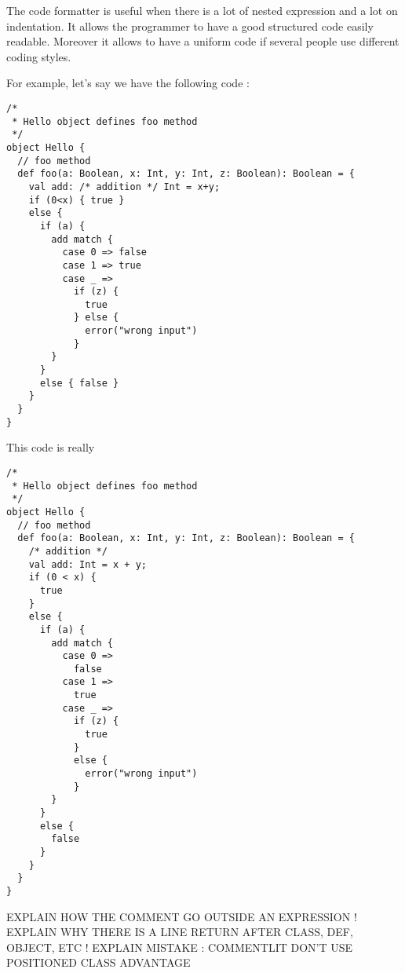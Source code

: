 The code formatter is useful when there is a lot of nested expression and a lot on indentation. It allows the programmer to have a good structured code easily readable. Moreover it allows to have a uniform code if several people use different coding styles.

For example, let's say we have the following code : \\

\begin{lstlisting}
/*
 * Hello object defines foo method
 */
object Hello {
  // foo method	
  def foo(a: Boolean, x: Int, y: Int, z: Boolean): Boolean = {
    val add: /* addition */ Int = x+y;
    if (0<x) { true } 
    else {
      if (a) {
        add match {
          case 0 => false
          case 1 => true
          case _ =>
            if (z) {
              true
            } else {
              error("wrong input")
            }
        }
      }
      else { false }
    }
  }
}
\end{lstlisting}

This code is really 

\begin{lstlisting}
/*
 * Hello object defines foo method
 */
object Hello {
  // foo method	
  def foo(a: Boolean, x: Int, y: Int, z: Boolean): Boolean = {
    /* addition */  	
    val add: Int = x + y;
    if (0 < x) {
      true
    }
    else {
      if (a) {
        add match {
          case 0 =>
            false
          case 1 =>
            true
          case _ =>
            if (z) {
              true
            }
            else {
              error("wrong input")
            }
        }
      }
      else {
        false
      }
    }
  }
}
\end{lstlisting}

EXPLAIN HOW THE COMMENT GO OUTSIDE AN EXPRESSION !
EXPLAIN WHY THERE IS A LINE RETURN AFTER CLASS, DEF, OBJECT, ETC !
EXPLAIN MISTAKE : COMMENTLIT DON'T USE POSITIONED CLASS ADVANTAGE


